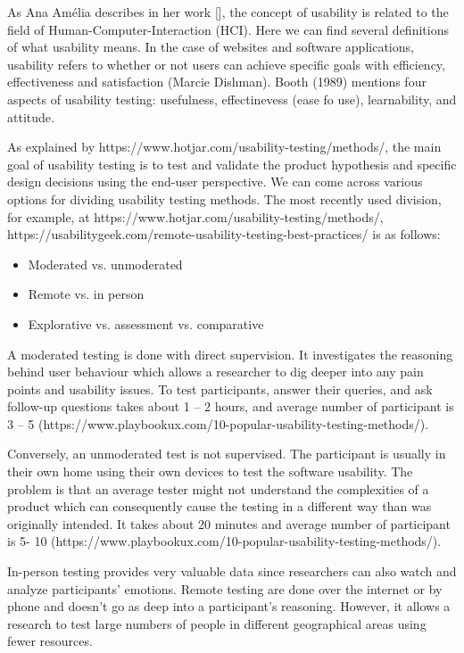 \documentclass[a4paper,10pt,twoside]{article}
\begin{document}
\noindent As Ana Amélia describes in her work [], the concept of usability is related to the field of Human-Computer-Interaction (HCI). Here we can find several definitions of what usability means. In the case of websites and software applications, usability refers to whether or not users can achieve specific goals with efficiency, effectiveness and satisfaction (Marcie Dishman). Booth (1989) mentions four aspects of usability testing: usefulness, effectinevess (ease fo use), learnability, and attitude.

As explained by https://www.hotjar.com/usability-testing/methods/, the main goal of usability testing is to test and validate the product hypothesis and specific design decisions using the end-user perspective. We can come across various options for dividing usability testing methods. The most recently used division, for example, at https://www.hotjar.com/usability-testing/methods/, https://usabilitygeek.com/remote-usability-testing-best-practices/ is as follows:

\begin{itemize}
\item	Moderated vs. unmoderated
\item	Remote vs. in person
\item	Explorative vs. assessment vs. comparative
\end{itemize}

\noindent A moderated testing is done with direct supervision. It investigates the reasoning behind user behaviour which allows a researcher to dig deeper into any pain points and usability issues. To test participants, answer their queries, and ask follow-up questions takes about 1 – 2 hours, and average number of participant is 3 – 5 (https://www.playbookux.com/10-popular-usability-testing-methods/). 

Conversely, an unmoderated test is not supervised. The participant is usually in their own home using their own devices to test the software usability. The problem is that an average tester might not understand the complexities of a product which can consequently cause the testing in a different way than was originally intended. It takes about 20 minutes and average number of participant is 5- 10 (https://www.playbookux.com/10-popular-usability-testing-methods/).

In-person testing provides very valuable data since researchers can also watch and analyze participants’ emotions. 
Remote testing are done over the internet or by phone and doesn’t go as deep into a participant’s reasoning. However, it allows a research to test large numbers of people in different geographical areas using fewer resources.
\end{document}
